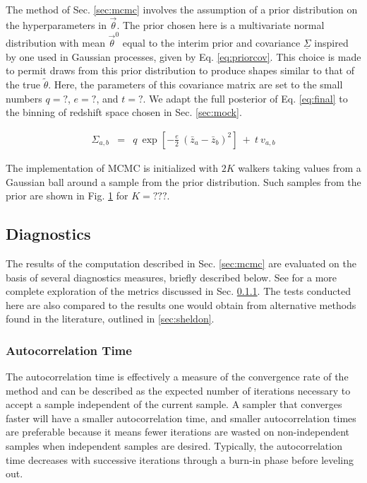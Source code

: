 \documentclass[preprint]{aastex}
\newcommand{\textul}{\underline}
\begin{document}
The method of Sec. \ref{sec:mcmc} involves the assumption of a prior 
distribution on the hyperparameters in $\vec{\theta}$.  The prior chosen here 
is a multivariate normal distribution with mean $\vec{\theta}^{0}$ equal to the 
interim prior and covariance $\textul{\Sigma}$ inspired by one used in Gaussian 
processes, given by Eq. \ref{eq:priorcov}.  This choice is made to permit draws 
from this prior distribution to produce shapes similar to that of the true 
$\tilde{\theta}$.  Here, the parameters of this covariance matrix are set to 
the small numbers $q=?$, $e=?$, and $t=?$.  We adapt the full posterior of Eq. 
\ref{eq:final} to the binning of redshift space chosen in Sec. \ref{sec:mock}.

\begin{eqnarray}
\label{eq:priorcov}
\Sigma_{a,b} &=& q\ \exp[-\frac{e}{2}\ (\bar{z}_{a}-\bar{z}_{b})^{2}]\ +\ t\ 
v_{a,b}
\end{eqnarray}

The implementation of MCMC is initialized with $2K$ walkers taking values from 
a Gaussian ball around a sample from the prior distribution.  Such samples from 
the prior are shown in Fig. \ref{fig:nullprior} for $K=???$.

\begin{figure}
\caption{}
\label{fig:nullprior}
\end{figure}

\clearpage
\subsection{Diagnostics}
\label{sec:diag}

The results of the computation described in Sec. \ref{sec:mcmc} are evaluated 
on the basis of several diagnostics measures, briefly described below.  See 
\citet{for12} for a more complete exploration of the metrics discussed in Sec. 
\ref{sec:acorr}.  The tests conducted here are also compared to the results one 
would obtain from alternative methods found in the literature, outlined in 
\ref{sec:sheldon}.

\clearpage
\subsubsection{Autocorrelation Time}
\label{sec:acorr}

The autocorrelation time is effectively a measure of the convergence rate of 
the method and can be described as the expected number of iterations necessary 
to accept a sample independent of the current sample.  A sampler that converges 
faster will have a smaller autocorrelation time, and smaller autocorrelation 
times are preferable because it means fewer iterations are wasted on 
non-independent samples when independent samples are desired.  Typically, the 
autocorrelation time decreases with successive iterations through a burn-in 
phase before leveling out.
\end{document}
